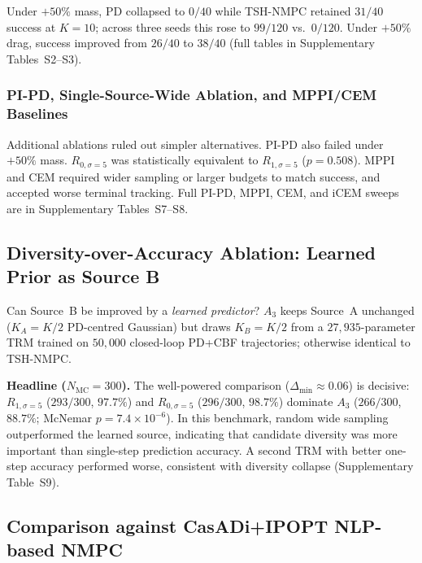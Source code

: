 \documentclass[11pt,onecolumn,a4paper]{article}
\newcommand{\Nm}{N_{\mathrm{MC}}}
\begin{document}
Under $+50\%$ mass, PD collapsed to $0/40$ while TSH-NMPC retained
$31/40$ success at $K = 10$; across three seeds this rose to
$99/120$ vs.\ $0/120$. Under $+50\%$ drag, success improved from
$26/40$ to $38/40$ (full tables in Supplementary Tables~S2--S3).

\subsubsection{PI-PD, Single-Source-Wide Ablation, and MPPI/CEM Baselines}\label{sec:exp-pi-baseline}

Additional ablations ruled out simpler alternatives. PI-PD also
failed under $+50\%$ mass. $R_{0,\sigma=5}$ was statistically
equivalent to $R_{1,\sigma=5}$ ($p = 0.508$). MPPI and CEM required
wider sampling or larger budgets to match success, and accepted worse
terminal tracking. Full PI-PD, MPPI, CEM, and iCEM sweeps are in
Supplementary Tables~S7--S8.
\label{sec:exp-r0-pd-s5}\label{sec:exp-mppi-cem}

\subsection{Diversity-over-Accuracy Ablation: Learned Prior as Source B}\label{sec:exp-negabl}

Can Source~B be improved by a \emph{learned predictor}? $A_{3}$ keeps
Source~A unchanged ($K_A = K/2$ PD-centred Gaussian) but draws
$K_B = K/2$ from a $27{,}935$-parameter TRM trained on $50{,}000$
closed-loop PD+CBF trajectories; otherwise identical to TSH-NMPC.

\textbf{Headline ($\Nm = 300$).} The well-powered comparison
($\Delta_{\min} \approx 0.06$) is decisive: $R_{1,\sigma=5}$
($293/300$, $97.7\%$) and $R_{0,\sigma=5}$ ($296/300$, $98.7\%$)
dominate $A_3$ ($266/300$, $88.7\%$; McNemar $p = 7.4 \times 10^{-6}$).
In this benchmark, random wide sampling outperformed the learned
source, indicating that candidate diversity was more important than
single-step prediction accuracy. A second TRM with better one-step
accuracy performed worse, consistent with diversity collapse
(Supplementary Table~S9).

\subsection{Comparison against CasADi+IPOPT NLP-based NMPC}\label{sec:exp-casadi}
\end{document}
